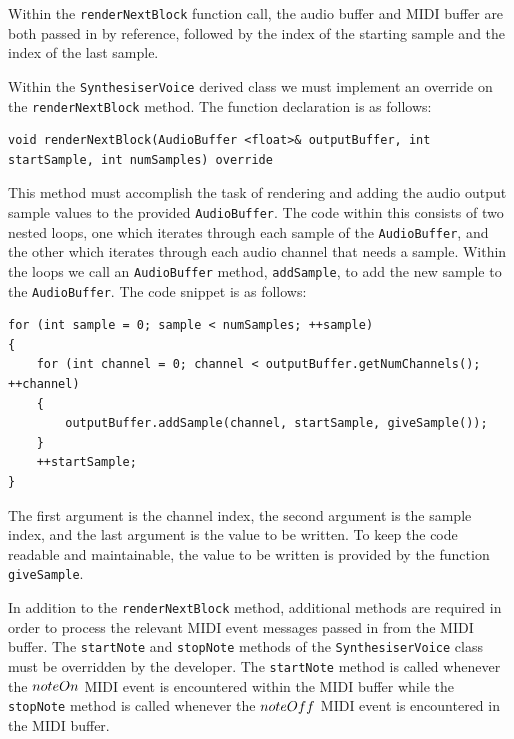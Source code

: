 \documentclass[a4paper,12pt]{report}
\begin{document}
Within the \texttt{renderNextBlock} function call, the audio buffer and MIDI buffer are both passed in by reference, followed by the index of the starting sample and the index of the last sample.

Within the \texttt{Synthesiser\-Voice} derived class we must implement an override on the \texttt{render\-Next\-Block} method. The function declaration is as follows:

 \noindent\begin{minipage}{\linewidth} \begin{lstlisting}[caption={renderNextBlock() Override},label={code:rendernextblockoverride},captionpos=b]
void renderNextBlock(AudioBuffer <float>& outputBuffer, int startSample, int numSamples) override
\end{lstlisting} \end{minipage}

This method must accomplish the task of rendering and adding the audio output sample values to the provided \texttt{Audio\-Buffer}. The code within this consists of two nested loops, one which iterates through each sample of the \texttt{Audio\-Buffer}, and the other which iterates through each audio channel that needs a sample. Within the loops we call an \texttt{Audio\-Buffer} method, \texttt{add\-Sample}, to add the new sample to the \texttt{Audio\-Buffer}. The code snippet is as follows:

 \noindent\begin{minipage}{\linewidth} \begin{lstlisting}[caption={addSample()},label={code:addsample},captionpos=b]
for (int sample = 0; sample < numSamples; ++sample)
{
    for (int channel = 0; channel < outputBuffer.getNumChannels(); ++channel)
    {
        outputBuffer.addSample(channel, startSample, giveSample());
    }
    ++startSample;
}
\end{lstlisting} \end{minipage}

The first argument is the channel index, the second argument is the sample index, and the last argument is the value to be written. To keep the code readable and maintainable, the value to be written is provided by the function \texttt{give\-Sample}. 

In addition to the \texttt{render\-Next\-Block} method, additional methods are required in order to process the relevant MIDI event messages passed in from the MIDI buffer. The \texttt{start\-Note} and \texttt{stop\-Note} methods of the \texttt{Synthesiser\-Voice} class must be overridden by the developer. The \texttt{start\-Note} method is called whenever the $note\-On$ MIDI event is encountered within the MIDI buffer while the \texttt{stop\-Note} method is called whenever the $note\-Off$ MIDI event is encountered in the MIDI buffer.	
\end{document}
